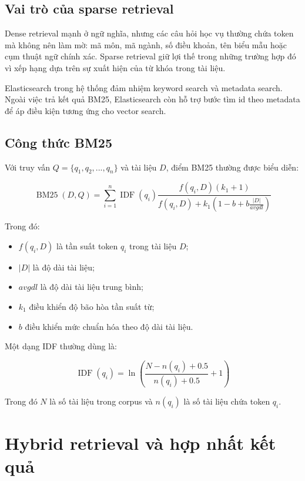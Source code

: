 \documentclass[../DoAn.tex]{subfiles}
\begin{document}
\subsection{Vai trò của sparse retrieval}

Dense retrieval mạnh ở ngữ nghĩa, nhưng các câu hỏi học vụ thường chứa token mà
không nên làm mờ: mã môn, mã ngành, số điều khoản, tên biểu mẫu hoặc cụm thuật
ngữ chính xác. Sparse retrieval giữ lợi thế trong những trường hợp đó vì xếp hạng
dựa trên sự xuất hiện của từ khóa trong tài liệu.

Elasticsearch trong hệ thống đảm nhiệm keyword search và metadata search. Ngoài
việc trả kết quả BM25, Elasticsearch còn hỗ trợ bước tìm id theo metadata để áp
điều kiện tương ứng cho vector search.

\subsection{Công thức BM25}

Với truy vấn $Q = \{q_1, q_2, ..., q_n\}$ và tài liệu $D$, điểm BM25 thường được
biểu diễn:

\begin{equation}
\operatorname{BM25}(D,Q) =
\sum_{i=1}^{n}
\operatorname{IDF}(q_i)
\frac{f(q_i,D)(k_1+1)}
{f(q_i,D)+k_1\left(1-b+b\frac{|D|}{avgdl}\right)}
\end{equation}

Trong đó:

\begin{itemize}
    \item $f(q_i,D)$ là tần suất token $q_i$ trong tài liệu $D$;
    \item $|D|$ là độ dài tài liệu;
    \item $avgdl$ là độ dài tài liệu trung bình;
    \item $k_1$ điều khiển độ bão hòa tần suất từ;
    \item $b$ điều khiển mức chuẩn hóa theo độ dài tài liệu.
\end{itemize}

Một dạng IDF thường dùng là:

\begin{equation}
\operatorname{IDF}(q_i) =
\ln\left(
\frac{N-n(q_i)+0.5}{n(q_i)+0.5}+1
\right)
\end{equation}

Trong đó $N$ là số tài liệu trong corpus và $n(q_i)$ là số tài liệu chứa token
$q_i$.

\section{Hybrid retrieval và hợp nhất kết quả}
\end{document}
